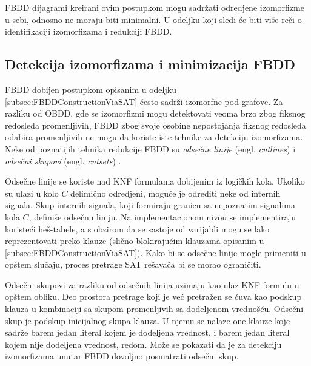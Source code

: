 FBDD dijagrami kreirani ovim postupkom mogu sadr\v{z}ati odredjene izomorfizme u sebi, odnosno ne moraju biti minimalni. U odeljku koji sledi \'c{}e biti vi\v{s}e re\v{c}i o identifikaciji izomorfizama i redukciji FBDD.


\subsection{Detekcija izomorfizama i minimizacija FBDD}
\label{subsec:FBDDMinimization}

FBDD dobijen postupkom opisanim u odeljku \ref{subsec:FBDDConstructionViaSAT} \v{c}esto sadr\v{z}i izomorfne pod-grafove. Za razliku od OBDD, gde se izomorfizmi mogu detektovati veoma brzo zbog fiksnog redosleda promenljivih, FBDD zbog svoje osobine nepostojanja fiksnog redosleda odabira promenljivih ne mogu da koriste iste tehnike za detekciju izomorfizama. Neke od poznatijih tehnika redukcije FBDD su \emph{odse\v{c}ne linije} (engl. \emph{cutlines}) i \emph{odse\v{c}ni skupovi} (engl. \emph{cutsets}) \cite{FBDD}.

Odse\v{c}ne linije se koriste nad KNF formulama dobijenim iz logi\v{c}kih kola. Ukoliko su ulazi u kolo $C$ delimi\v{c}no odredjeni, mogu\'c{}e je odrediti neke od internih signala. Skup internih signala, koji formiraju granicu sa nepoznatim signalima kola $C$, defini\v{s}e odse\v{c}nu liniju. Na implementacionom nivou se implementiraju koriste\'c{}i he\v{s}-tabele, a s obzirom da se sastoje od varijabli mogu se lako reprezentovati preko klauze (sli\v{c}no blokiraju\'c{}im klauzama opisanim u \ref{subsec:FBDDConstructionViaSAT}). Kako bi se odse\v{c}ne linije mogle primeniti u op\v{s}tem slu\v{c}aju, proces pretrage SAT re\v{s}ava\v{c}a bi se morao ograni\v{c}iti.

Odse\v{c}ni skupovi za razliku od odse\v{c}nih linija uzimaju kao ulaz KNF formulu u op\v{s}tem obliku. Deo prostora pretrage koji je ve\'c{} pretra\v{z}en se \v{c}uva kao podskup klauza u kombinaciji sa skupom promenljivih sa dodeljenom vredno\v{s}\'c{}u. Odse\v{c}ni skup je podskup inicijalnog skupa klauza. U njemu se nalaze one klauze koje sadr\v{z}e barem jedan literal kojem je dodeljena vrednost, i barem jedan literal kojem nije dodeljena vrednost, redom. Mo\v{z}e se pokazati da je za detekciju izomorfizama unutar FBDD dovoljno posmatrati odse\v{c}ni skup.
